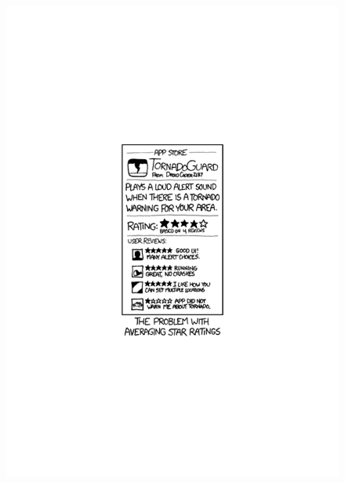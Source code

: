 \begin{figure}
\RawFloats
\centering
\begin{minipage}{.4\linewidth}
  \centering
  \includegraphics[width=\textwidth]{images/xkcd/tornadoguard.pdf}
  \label{fig:xkcd-tornadoguard}
\end{minipage}\hfill%
\begin{minipage}{.5\textwidth}
  \centering

\end{minipage}
\end{figure}
